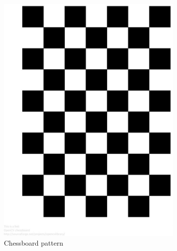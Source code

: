 \begin{figure}[H]
\begin{subfigure}[b]{0.24 \textwidth}
    \includegraphics[width=\textwidth]{images/registration/chessboard.jpg}
    \caption{Chessboard pattern}
    \label{figure:chessboard}
  \end{subfigure}
  \hfill
  \begin{subfigure}[b]{0.24\textwidth}

\end{subfigure}
\end{figure}
